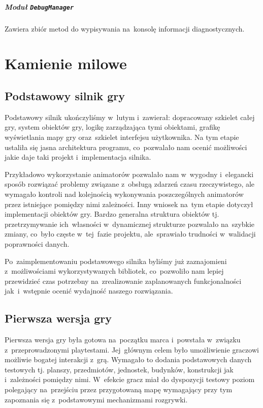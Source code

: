 \documentclass[licencjacka]{pracamgr}
\begin{document}
    \paragraph{Moduł \texttt{DebugManager}}
      Zawiera zbiór metod do wypisywania na~konsolę informacji diagnostycznych.

  \chapter{Kamienie milowe}
  \label{ch:KamienieMilowe}
    \section{Podstawowy silnik gry}
      Podstawowy silnik ukończyliśmy w~lutym i~zawierał: dopracowany szkielet całej gry, system obiektów gry, logikę
      zarządzająca tymi obiektami, grafikę wyświetlania mapy gry oraz~szkielet interfejsu użytkownika. Na tym etapie
      ustaliła się jasna architektura programu, co~pozwalało nam ocenić możliwości jakie daje taki projekt i~implementacja
      silnika.
      
      Przykładowo wykorzystanie animatorów pozwalało nam w~wygodny i~elegancki sposób rozwiązać problemy związane
      z~obsługą zdarzeń czasu rzeczywistego, ale wymagało kontroli nad kolejnością wykonywania poszczególnych
      animatorów przez istniejące pomiędzy nimi zależności. Inny wniosek na~tym etapie dotyczył implementacji obiektów gry.
      Bardzo generalna struktura obiektów tj. przetrzymywanie ich~własności w~dynamicznej strukturze pozwalało na~szybkie
      zmiany, co~było częste w~tej~fazie projektu, ale~sprawiało trudności w~walidacji poprawności danych.

      Po~zaimplementowaniu podstawowego silnika byliśmy już zaznajomieni z~możliwościami wykorzystywanych bibliotek, 
      co~pozwoliło nam lepiej przewidzieć czas potrzebny na~zrealizowanie zaplanowanych funkcjonalności jak~i~wstępnie
      ocenić wydajność naszego rozwiązania.

    \section{Pierwsza wersja gry}
      Pierwsza wersja gry była gotowa na~początku marca i~powstała w~związku z~przeprowadzonymi playtestami. Jej~głównym
      celem było umożliwienie graczowi możliwie bogatej interakcji z~grą. Wymagało to dodania podstawowych danych testowych
      tj. planszy, przedmiotów, jednostek, budynków, konstrukcji jak i~zależności pomiędzy nimi. W~efekcie gracz miał do
      dyspozycji testowy poziom polegający na~przejściu przez przygotowaną mapę wymagający przy tym zapoznania się
      z~podstawowymi mechanizmami rozgrywki.
\end{document}
